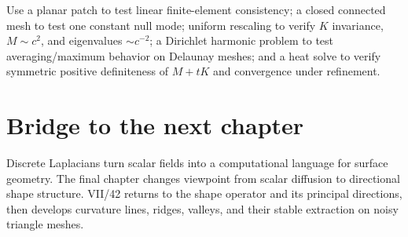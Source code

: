 \begin{solution}
Use a planar patch to test linear finite-element consistency; a closed connected mesh to test one constant null mode; uniform rescaling to verify \(K\) invariance, \(M\sim c^2\), and eigenvalues \(\sim c^{-2}\); a Dirichlet harmonic problem to test averaging/maximum behavior on Delaunay meshes; and a heat solve to verify symmetric positive definiteness of \(M+tK\) and convergence under refinement.
\end{solution}


\section{Bridge to the next chapter}

Discrete Laplacians turn scalar fields into a computational language for
surface geometry.  The final chapter changes viewpoint from scalar diffusion to
directional shape structure.  VII/42 returns to the shape operator and its
principal directions, then develops curvature lines, ridges, valleys, and their
stable extraction on noisy triangle meshes.
